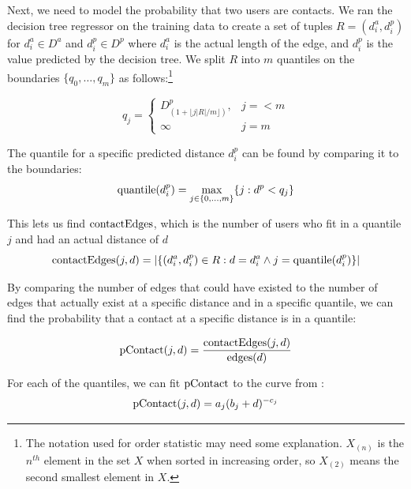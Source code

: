 
Next, we need to model the probability that two users are contacts.
%
We ran the decision tree regressor on the training data to create a set of
tuples $R = (d^a_i, d^p_i)$ for $d^a_i \in D^a$ and $d^p_i \in D^p$ where
$d^a_i$ is the actual length of the edge, and $d^p_i$ is the value predicted by
the decision tree.
%
We split $R$ into $m$ quantiles on the boundaries $\{q_0,\dots,q_m\}$ as
follows:\footnote{The notation used for order statistic may need some
explanation.  $X_{(n)}$ is the $n^{th}$ element in the set $X$ when sorted in
increasing order, so $X_{(2)}$ means the second smallest element in $X$.}

\[
    q_j =
    \begin{cases}
        D^p_{(1+\lfloor j|R|/m \rfloor)}, & j=<m \\
        \infty & j=m
    \end{cases}
\]


The quantile for a specific predicted distance $d^p_i$ can be found by
comparing it to the boundaries:
\[
    \operatorname{quantile}(d^p_i) = \max_{j \in \{0,\dots,m\}} \{j: d^p<q_j\}
\]

This lets us find $\operatorname{contactEdges}$, which is the number of users who fit in a
quantile $j$ and had an actual distance of $d$
\[
    \operatorname{contactEdges}(j,d) = |\{
            (d^a_i,d^p_i) \in R :
            d=d^a_i \wedge j=\operatorname{quantile}(d^p_i)
        \}|
\]

By comparing the number of edges that could have existed to the number of edges
that actually exist at a specific distance and in a specific quantile, we can
find the probability that a contact at a specific distance is in a quantile:

\[
\operatorname{pContact}(j,d) = \frac{\operatorname{contactEdges}(j,d)}{\operatorname{edges}(d)}
\]

For each of the quantiles, we can fit $\operatorname{pContact}$ to the curve from
\cite{backstrom2010find}:
\[
    \operatorname{pContact}(j,d) = a_{j} (b_{j}+d)^{-c_{j}}
\]

